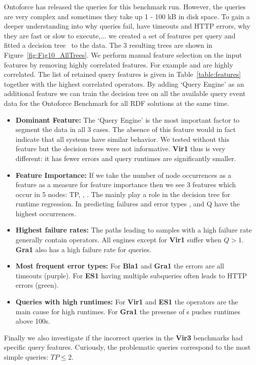 Ontoforce has released the queries for this benchmark run. However, the queries are very complex and sometimes they take up 1 - 100 kB in disk space. To gain a deeper understanding into why queries fail, have timeouts and HTTP errors, why they are fast or slow to execute,... we created a set of features per query and fitted a decision tree~\cite{sklearndtree} to the data. The 3 resulting trees are shown in Figure~\ref{fig:Fig10_AllTrees}. We perform manual feature selection on the input features by removing highly correlated features. For example  and  are highly correlated. The list of retained query features is given in Table~\ref{table:features} together with the highest correlated operators.
By adding `Query Engine' as an additional feature we can train the decision tree on all the available query event data for the Ontoforce Benchmark for all RDF solutions at the same time. 
\begin{itemize}
	\item \textbf{Dominant Feature:} The `Query Engine' is the most important factor to segment the data in all 3 cases. The absence of this feature would in fact indicate that all systems have similar behavior. We tested without this feature but the decision trees were not informative. \textbf{Vir1} thus is very different: it has fewer errors and query runtimes are significantly smaller.
	\item \textbf{Feature Importance:} If we take the number of node occurrences as a feature as a measure for feature importance then we see 3 features which occur in 5 nodes: TP, , . The  mainly play a role in the decision tree for runtime regression. In predicting failures and error types ,  and Q have the highest occurrences.
	\item \textbf{Highest failure rates:} The paths leading to samples with a high failure rate generally contain  operators. All engines except for \textbf{Vir1} suffer when $Q > 1$. \textbf{Gra1} also has a high failure rate for  queries.
	\item \textbf{Most frequent error types:} For \textbf{Bla1} and \textbf{Gra1} the errors are all timeouts (purple). For \textbf{ES1} having multiple subqueries often leads to HTTP errors (green). 
	\item \textbf{Queries with high runtimes:} For \textbf{Vir1} and \textbf{ES1} the  operators are the main cause for high runtimes. For \textbf{Gra1} the presense of s pushes runtimes above 100s. 
\end{itemize}

Finally we also investigate if the incorrect queries in the \textbf{Vir3} benchmarks had specific query features. Curiously, the problematic queries correspond to the most simple queries: $TP \leq 2$.	
